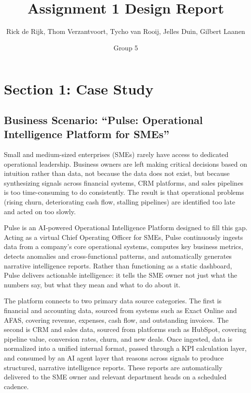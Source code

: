 \documentclass[
  letterpaper,
  DIV=11,
  numbers=noendperiod]{scrartcl}
\title{Assignment 1 Design Report}
\subtitle{Rick de Rijk, Thom Verzantvoort, Tycho van Rooij, Jelles Duin,
Gilbert Laanen}
\author{Group 5}
\date{}
\renewcommand*\contentsname{Table of contents}
\newcommand\contentsname{Table of contents}
\begin{document}
\maketitle

\renewcommand*\contentsname{Table of contents}
{
\hypersetup{linkcolor=}
\setcounter{tocdepth}{3}
\tableofcontents
}
\listoffigures

\newpage

\section{Section 1: Case Study}\label{section-1-case-study}

\subsection{\texorpdfstring{\textbf{Business Scenario: ``Pulse:
Operational Intelligence Platform for
SMEs''}}{Business Scenario: ``Pulse: Operational Intelligence Platform for SMEs''}}\label{business-scenario-pulse-operational-intelligence-platform-for-smes}

Small and medium-sized enterprises (SMEs) rarely have access to
dedicated operational leadership. Business owners are left making
critical decisions based on intuition rather than data, not because the
data does not exist, but because synthesizing signals across financial
systems, CRM platforms, and sales pipelines is too time-consuming to do
consistently. The result is that operational problems (rising churn,
deteriorating cash flow, stalling pipelines) are identified too late and
acted on too slowly.

Pulse is an AI-powered Operational Intelligence Platform designed to
fill this gap. Acting as a virtual Chief Operating Officer for SMEs,
Pulse continuously ingests data from a company's core operational
systems, computes key business metrics, detects anomalies and
cross-functional patterns, and automatically generates narrative
intelligence reports. Rather than functioning as a static dashboard,
Pulse delivers actionable intelligence: it tells the SME owner not just
what the numbers say, but what they mean and what to do about it.

The platform connects to two primary data source categories. The first
is financial and accounting data, sourced from systems such as Exact
Online and AFAS, covering revenue, expenses, cash flow, and outstanding
invoices. The second is CRM and sales data, sourced from platforms such
as HubSpot, covering pipeline value, conversion rates, churn, and new
deals. Once ingested, data is normalized into a unified internal format,
passed through a KPI calculation layer, and consumed by an AI agent
layer that reasons across signals to produce structured, narrative
intelligence reports. These reports are automatically delivered to the
SME owner and relevant department heads on a scheduled cadence.
\end{document}
